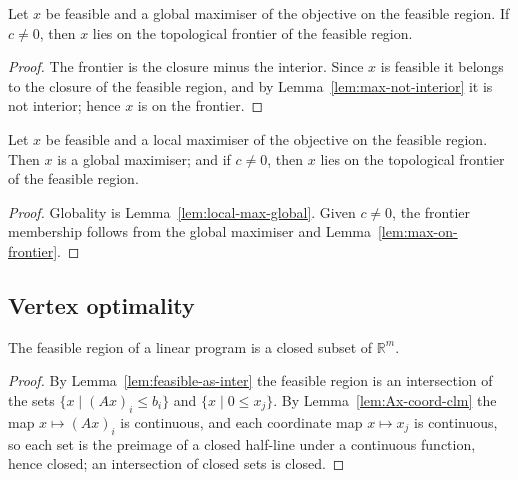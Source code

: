 \begin{lemma}
    \label{lem:max-on-frontier}
    \leanok
    Let $x$ be feasible and a global maximiser of the objective on the feasible
    region. If $c \ne 0$, then $x$ lies on the topological frontier of the
    feasible region.
\end{lemma}
\begin{proof}
    The frontier is the closure minus the interior. Since $x$ is feasible it
    belongs to the closure of the feasible region, and by
    Lemma~\ref{lem:max-not-interior} it is not interior; hence $x$ is on the
    frontier.
\end{proof}

\begin{theorem}
    \label{thm:lp-maximum-principle}
    \leanok
    Let $x$ be feasible and a local maximiser of the objective on the feasible
    region. Then $x$ is a global maximiser; and if $c \ne 0$, then $x$ lies on
    the topological frontier of the feasible region.
\end{theorem}
\begin{proof}
    Globality is Lemma~\ref{lem:local-max-global}. Given $c \ne 0$, the frontier
    membership follows from the global maximiser and
    Lemma~\ref{lem:max-on-frontier}.
\end{proof}

\subsection{Vertex optimality}

\begin{lemma}
    \label{lem:feasible-closed}
    \leanok
    The feasible region of a linear program is a closed subset of $\mathbb{R}^m$.
\end{lemma}
\begin{proof}
    By Lemma~\ref{lem:feasible-as-inter} the feasible region is an intersection
    of the sets $\{x \mid (A x)_i \le b_i\}$ and $\{x \mid 0 \le x_j\}$. By
    Lemma~\ref{lem:Ax-coord-clm} the map $x \mapsto (A x)_i$ is continuous, and
    each coordinate map $x \mapsto x_j$ is continuous, so each set is the preimage
    of a closed half-line under a continuous function, hence closed; an
    intersection of closed sets is closed.
\end{proof}

